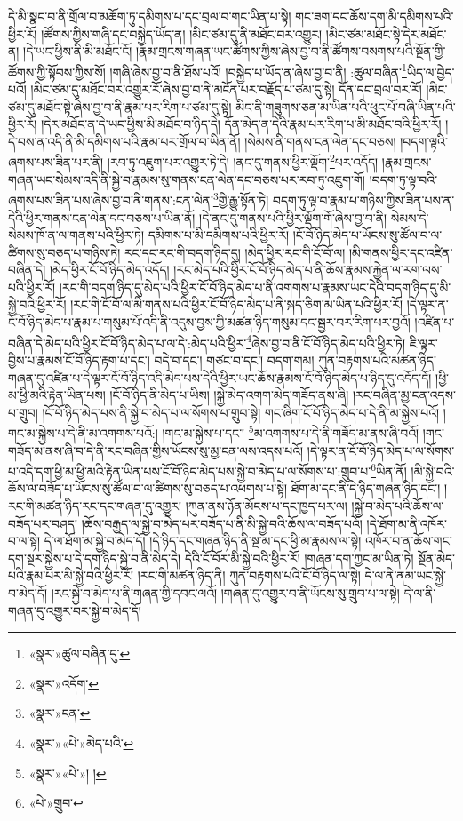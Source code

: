 དེ་མི་སྣང་བ་ནི་གྲོལ་བ་མཆོག་ཏུ་དམིགས་པ་དང་བྲལ་བ་གང་ཡིན་པ་སྟེ། གང་ཟག་དང་ཆོས་དག་མི་དམིགས་པའི་ཕྱིར་རོ། །ཚོགས་ཀྱིས་གཞི་དང་བསྐྱེད་ཡོད་ན། །མིང་ཙམ་དུ་ནི་མཐོང་བར་འགྱུར། །མིང་ཙམ་མཐོང་སྟེ་དེར་མཐོང་ན། །དེ་ཡང་ཕྱིས་ནི་མི་མཐོང་ངོ། །རྣམ་གྲངས་གཞན་ཡང་ཚོགས་ཀྱིས་ཞེས་བྱ་བ་ནི་ཚོགས་བསགས་པའི་སྔོན་གྱི་ཚོགས་ཀྱི་སྟོབས་ཀྱིས་སོ། །གཞི་ཞེས་བྱ་བ་ནི་ཐོས་པའོ། །བསྐྱེད་པ་ཡོད་ན་ཞེས་བྱ་བ་ནི། :ཚུལ་བཞིན་\footnote{«སྣར་»ཚུལ་བཞིན་དུ་}ཡིད་ལ་བྱེད་པའོ། །མིང་ཙམ་དུ་མཐོང་བར་འགྱུར་རོ་ཞེས་བྱ་བ་ནི་མངོན་པར་བརྗོད་པ་ཙམ་དུ་སྟེ། དོན་དང་བྲལ་བར་རོ། །མིང་ཙམ་དུ་མཐོང་སྟེ་ཞེས་བྱ་བ་ནི་རྣམ་པར་རིག་པ་ཙམ་དུ་སྟེ། མིང་ནི་གཟུགས་ཅན་མ་ཡིན་པའི་ཕུང་པོ་བཞི་ཡིན་པའི་ཕྱིར་རོ། །དེར་མཐོང་ན་དེ་ཡང་ཕྱིས་མི་མཐོང་བ་ཉིད་དེ། དོན་མེད་ན་དེའི་རྣམ་པར་རིག་པ་མི་མཐོང་བའི་ཕྱིར་རོ། །དེ་བས་ན་འདི་ནི་མི་དམིགས་པའི་རྣམ་པར་གྲོལ་བ་ཡིན་ནོ། །སེམས་ནི་གནས་ངན་ལེན་དང་བཅས། །བདག་ལྟའི་ཞགས་པས་ཟིན་པར་ནི། །རབ་ཏུ་འཇུག་པར་འགྱུར་ཏེ་དེ། །ནང་དུ་གནས་ཕྱིར་ལྡོག་\footnote{«སྣར་»འདོག་}པར་འདོད། །རྣམ་གྲངས་གཞན་ཡང་སེམས་འདི་ནི་སྐྱེ་བ་རྣམས་སུ་གནས་ངན་ལེན་དང་བཅས་པར་རབ་ཏུ་འཇུག་གོ། །བདག་ཏུ་ལྟ་བའི་ཞགས་པས་ཟིན་པས་ཞེས་བྱ་བ་ནི་གནས་:ངན་ལེན་\footnote{«སྣར་»ངན་}གྱི་རྒྱུ་སྟོན་ཏེ། བདག་ཏུ་ལྟ་བ་རྣམ་པ་གཉིས་ཀྱིས་ཟིན་པས་ན་དེའི་ཕྱིར་གནས་ངན་ལེན་དང་བཅས་པ་ཡིན་ནོ། །དེ་ནང་དུ་གནས་པའི་ཕྱིར་ལྡོག་གོ་ཞེས་བྱ་བ་ནི། སེམས་དེ་སེམས་ཁོ་ན་ལ་གནས་པའི་ཕྱིར་ཏེ། དམིགས་པ་མི་དམིགས་པའི་ཕྱིར་རོ། །ངོ་བོ་ཉིད་མེད་པ་ཡོངས་སུ་ཚོལ་བ་ལ་ཚིགས་སུ་བཅད་པ་གཉིས་ཏེ། རང་དང་རང་གི་བདག་ཉིད་དུ། །མེད་ཕྱིར་རང་གི་ངོ་བོ་ལ། །མི་གནས་ཕྱིར་དང་འཛིན་བཞིན་དེ། །མེད་ཕྱིར་ངོ་བོ་ཉིད་མེད་འདོད། །རང་མེད་པའི་ཕྱིར་ངོ་བོ་ཉིད་མེད་པ་ནི་ཆོས་རྣམས་རྐྱེན་ལ་རག་ལས་པའི་ཕྱིར་རོ། །རང་གི་བདག་ཉིད་དུ་མེད་པའི་ཕྱིར་ངོ་བོ་ཉིད་མེད་པ་ནི་འགགས་པ་རྣམས་ཡང་དེའི་བདག་ཉིད་དུ་མི་སྐྱེ་བའི་ཕྱིར་རོ། །རང་གི་ངོ་བོ་ལ་མི་གནས་པའི་ཕྱིར་ངོ་བོ་ཉིད་མེད་པ་ནི་སྐད་ཅིག་མ་ཡིན་པའི་ཕྱིར་རོ། །དེ་ལྟར་ན་ངོ་བོ་ཉིད་མེད་པ་རྣམ་པ་གསུམ་པོ་འདི་ནི་འདུས་བྱས་ཀྱི་མཚན་ཉིད་གསུམ་དང་སྦྱར་བར་རིག་པར་བྱའོ། །འཛིན་པ་བཞིན་དེ་མེད་པའི་ཕྱིར་ངོ་བོ་ཉིད་མེད་པ་ལ་དེ་:མེད་པའི་ཕྱིར་\footnote{«སྣར་»«པེ་»མེད་པའི་}ཞེས་བྱ་བ་ནི་ངོ་བོ་ཉིད་མེད་པའི་ཕྱིར་ཏེ། ཇི་ལྟར་བྱིས་པ་རྣམས་ངོ་བོ་ཉིད་རྟག་པ་དང་། བདེ་བ་དང་། གཙང་བ་དང་། བདག་གམ། ཀུན་བརྟགས་པའི་མཚན་ཉིད་གཞན་དུ་འཛིན་པ་དེ་ལྟར་ངོ་བོ་ཉིད་འདི་མེད་པས་དེའི་ཕྱིར་ཡང་ཆོས་རྣམས་ངོ་བོ་ཉིད་མེད་པ་ཉིད་དུ་འདོད་དོ། །ཕྱི་མ་ཕྱི་མའི་རྟེན་ཡིན་པས། །ངོ་བོ་ཉིད་ནི་མེད་པ་ཡིས། །སྐྱེ་མེད་འགག་མེད་གཟོད་ནས་ཞི། །རང་བཞིན་མྱ་ངན་འདས་པ་གྲུབ། །ངོ་བོ་ཉིད་མེད་པས་ནི་སྐྱེ་བ་མེད་པ་ལ་སོགས་པ་གྲུབ་སྟེ། གང་ཞིག་ངོ་བོ་ཉིད་མེད་པ་དེ་ནི་མ་སྐྱེས་པའོ། །གང་མ་སྐྱེས་པ་དེ་ནི་མ་འགགས་པའོ:། །གང་མ་སྐྱེས་པ་དང་། \footnote{«སྣར་»«པེ་»། ། }མ་འགགས་པ་དེ་ནི་གཟོད་མ་ནས་ཞི་བའོ། །གང་གཟོད་མ་ནས་ཞི་བ་དེ་ནི་རང་བཞིན་གྱིས་ཡོངས་སུ་མྱ་ངན་ལས་འདས་པའོ། །དེ་ལྟར་ན་ངོ་བོ་ཉིད་མེད་པ་ལ་སོགས་པ་འདི་དག་ཕྱི་མ་ཕྱི་མའི་རྟེན་ཡིན་པས་ངོ་བོ་ཉིད་མེད་པས་སྐྱེ་བ་མེད་པ་ལ་སོགས་པ་:གྲུབ་པ་\footnote{«པེ་»གྲུབ་}ཡིན་ནོ། །མི་སྐྱེ་བའི་ཆོས་ལ་བཟོད་པ་ཡོངས་སུ་ཚོལ་བ་ལ་ཚིགས་སུ་བཅད་པ་འཕགས་པ་སྟེ། ཐོག་མ་དང་ནི་དེ་ཉིད་གཞན་ཉིད་དང་། །རང་གི་མཚན་ཉིད་རང་དང་གཞན་དུ་འགྱུར། །ཀུན་ནས་ཉོན་མོངས་པ་དང་ཁྱད་པར་ལ། །སྐྱེ་བ་མེད་པའི་ཆོས་ལ་བཟོད་པར་བཤད། །ཆོས་བརྒྱད་ལ་སྐྱེ་བ་མེད་པར་བཟོད་པ་ནི་མི་སྐྱེ་བའི་ཆོས་ལ་བཟོད་པའོ། །དེ་ཐོག་མ་ནི་འཁོར་བ་ལ་སྟེ། དེ་ལ་ཐོག་མ་སྐྱེ་བ་མེད་དོ། །དེ་ཉིད་དང་གཞན་ཉིད་ནི་སྔ་མ་དང་ཕྱི་མ་རྣམས་ལ་སྟེ། འཁོར་བ་ན་ཆོས་གང་དག་སྔར་སྐྱེས་པ་དེ་དག་ཉིད་སྐྱེ་བ་ནི་མེད་དེ། དེའི་ངོ་བོར་མི་སྐྱེ་བའི་ཕྱིར་རོ། །གཞན་དག་ཀྱང་མ་ཡིན་ཏེ། སྔོན་མེད་པའི་རྣམ་པར་མི་སྐྱེ་བའི་ཕྱིར་རོ། །རང་གི་མཚན་ཉིད་ནི། ཀུན་བརྟགས་པའི་ངོ་བོ་ཉིད་ལ་སྟེ། དེ་ལ་ནི་ནམ་ཡང་སྐྱེ་བ་མེད་དོ། །རང་སྐྱེ་བ་མེད་པ་ནི་གཞན་གྱི་དབང་ལའོ། །གཞན་དུ་འགྱུར་བ་ནི་ཡོངས་སུ་གྲུབ་པ་ལ་སྟེ། དེ་ལ་ནི་གཞན་དུ་འགྱུར་བར་སྐྱེ་བ་མེད་དོ། 